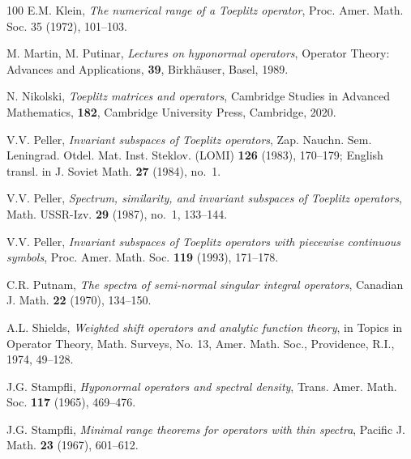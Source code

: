 \documentclass[11pt]{amsart}
\numberwithin{equation}{section}
\theoremstyle{definition}
\theoremstyle{remark}
\begin{document}
\begin{thebibliography}{100}
 E.M. Klein, \emph{The numerical range of a Toeplitz operator}, Proc. Amer. Math. Soc. 35 (1972), 101--103.


 M. Martin, M. Putinar, \emph{Lectures on hyponormal operators}, Operator Theory: Advances and Applications, \textbf{39}, Birkh\"auser, Basel, 1989.



 N. Nikolski, \emph{Toeplitz matrices and operators}, Cambridge Studies in Advanced Mathematics, \textbf{182}, Cambridge University Press, Cambridge, 2020.

 V.V. Peller, \emph{Invariant subspaces of Toeplitz operators}, Zap. Nauchn. Sem. Leningrad. Otdel. Mat. Inst. Steklov. (LOMI) \textbf{126} (1983), 170--179; English transl. in J. Soviet Math. \textbf{27} (1984), no.~1.

 V.V. Peller, \emph{Spectrum, similarity, and invariant subspaces of Toeplitz operators}, Math. USSR-Izv. \textbf{29} (1987), no.~1, 133--144.

 V.V. Peller, \emph{Invariant subspaces of Toeplitz operators with piecewise continuous symbols}, Proc. Amer. Math. Soc. \textbf{119} (1993), 171--178.

 C.R. Putnam, \emph{The spectra of semi-normal singular integral operators}, Canadian J. Math. \textbf{22} (1970), 134--150.






 A.L. Shields, \emph{Weighted shift operators and analytic function theory}, in Topics in Operator Theory, Math. Surveys, No. 13, Amer. Math. Soc., Providence, R.I., 1974, 49--128.

 J.G. Stampfli, \emph{Hyponormal operators and spectral density}, Trans. Amer. Math. Soc. \textbf{117} (1965), 469--476.

 J.G. Stampfli, \emph{Minimal range theorems for operators with thin spectra}, Pacific J. Math. \textbf{23} (1967), 601--612.
\end{thebibliography}
\end{document}
